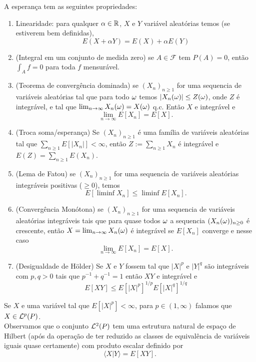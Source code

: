 \begin{proposition}
 A esperança tem as seguintes propriedades:


\begin{enumerate}[\quad a)]
\item Linearidade: para qualquer $\alpha\in {\ensuremath{\mathbb R}}$, $X$ e $Y$ variável aleatórias temos (se estiverem bem definidas),
$$E(X + \alpha Y) = E(X) + \alpha E(Y)$$
\item (Integral em um conjunto de medida zero) se $A \in \mathcal{F}$ tem $P(A) = 0$, então $\int_A f = 0$ para toda $f$ mensurável.
\item (Teorema de convergência dominada) se $(X_n)_{n\ge 1}$ for uma sequencia de variáveis  aleatórias  tal que para todo $\omega$ temos $|X_n(\omega)| \le Z(\omega)$, onde $Z$ é integrável, e tal que $\lim_{n\to \infty} X_n(\omega)=X(\omega)$ q.c.
Então $X$ e integrável e
$$\lim_{n\to \infty} E[X_n]=E[X].$$
 \item (Troca soma/esperança) Se $(X_n)_{n\ge 1}$ é uma família de variáveis aleatórias tal que $\sum_{n\ge 1} E[|X_n|]<\infty$,
 então $Z := \sum_{n \ge 1} X_n$ é integrável e $E(Z) = \sum_{n \geq 1} E(X_n)$.
\item (Lema de Fatou)  se $(X_n)_{n\ge 1}$ for uma sequencia de variáveis  aleatórias  integráveis positivas ($\ge 0$), temos
$$E[\liminf X_n]\le \liminf E[X_n].$$
\item (Convergência Monótona) se $(X_n)_{n\ge 1}$ for uma sequencia de variáveis aleatórias  integráveis tais que para quase todos $\omega$ a sequencia $(X_n(\omega))_{n\ge 0}$ é crescente, então $X = \lim_{n \to \infty} X_n(\omega)$ é integrável se $E[X_n]$ converge e nesse caso
  \begin{equation}
    \lim_{n \to \infty} E[X_n] = E[X].
  \end{equation}
\item (Desigualdade de H\"older) Se $X$ e $Y$ fossem tal que $|X|^p$ e $|Y|^q$ são integráveis com $p,q>0$ tais que $p^{-1}+q^{-1}=1$
então $XY$  e integrável e
$$E[XY]\le E[|X|^p]^{1/p} E[|X|^q]^{1/q}$$

\end{enumerate}
\end{proposition}

\begin{remark}
 Se $X$ e uma variável tal que $E[|X|^p]<\infty$, para $p\in (1,\infty)$ falamos que $X\in {\ensuremath{\mathcal L}}^p(P)$. \\
Observamos que o conjunto ${\mathcal L}^2(P)$ tem uma estrutura natural de espaço de Hilbert
(após da operação de ter reduzido as classes de equivalência de variáveis iguais quase certamente) com produto escalar definido por
$$\langle X | Y \rangle= E[XY].$$
\end{remark}




